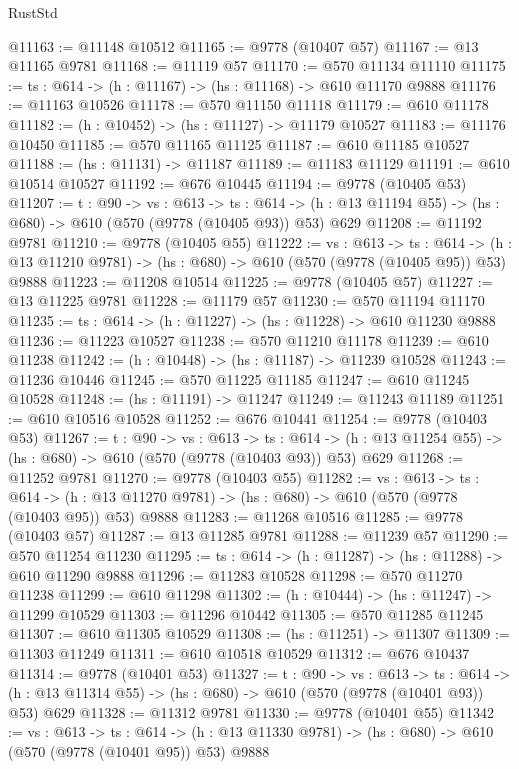 \begin{lexlean}{RustStd}
\begin{coremodule}
@11163 := @11148 @10512
@11165 := @9778 (@10407 @57)
@11167 := @13 @11165 @9781
@11168 := @11119 @57
@11170 := @570 @11134 @11110
@11175 := {ts : @614} -> (h : @11167) -> (hs : @11168) -> @610 @11170 @9888
@11176 := @11163 @10526
@11178 := @570 @11150 @11118
@11179 := @610 @11178
@11182 := (h : @10452) -> (hs : @11127) -> @11179 @10527
@11183 := @11176 @10450
@11185 := @570 @11165 @11125
@11187 := @610 @11185 @10527
@11188 := (hs : @11131) -> @11187
@11189 := @11183 @11129
@11191 := @610 @10514 @10527
@11192 := @676 @10445
@11194 := @9778 (@10405 @53)
@11207 := {t : @90} ->
  {vs : @613} ->
  {ts : @614} -> (h : @13 @11194 @55) -> (hs : @680) -> @610 (@570 (@9778 (@10405 @93)) @53) @629
@11208 := @11192 @9781
@11210 := @9778 (@10405 @55)
@11222 := {vs : @613} ->
  {ts : @614} -> (h : @13 @11210 @9781) -> (hs : @680) -> @610 (@570 (@9778 (@10405 @95)) @53) @9888
@11223 := @11208 @10514
@11225 := @9778 (@10405 @57)
@11227 := @13 @11225 @9781
@11228 := @11179 @57
@11230 := @570 @11194 @11170
@11235 := {ts : @614} -> (h : @11227) -> (hs : @11228) -> @610 @11230 @9888
@11236 := @11223 @10527
@11238 := @570 @11210 @11178
@11239 := @610 @11238
@11242 := (h : @10448) -> (hs : @11187) -> @11239 @10528
@11243 := @11236 @10446
@11245 := @570 @11225 @11185
@11247 := @610 @11245 @10528
@11248 := (hs : @11191) -> @11247
@11249 := @11243 @11189
@11251 := @610 @10516 @10528
@11252 := @676 @10441
@11254 := @9778 (@10403 @53)
@11267 := {t : @90} ->
  {vs : @613} ->
  {ts : @614} -> (h : @13 @11254 @55) -> (hs : @680) -> @610 (@570 (@9778 (@10403 @93)) @53) @629
@11268 := @11252 @9781
@11270 := @9778 (@10403 @55)
@11282 := {vs : @613} ->
  {ts : @614} -> (h : @13 @11270 @9781) -> (hs : @680) -> @610 (@570 (@9778 (@10403 @95)) @53) @9888
@11283 := @11268 @10516
@11285 := @9778 (@10403 @57)
@11287 := @13 @11285 @9781
@11288 := @11239 @57
@11290 := @570 @11254 @11230
@11295 := {ts : @614} -> (h : @11287) -> (hs : @11288) -> @610 @11290 @9888
@11296 := @11283 @10528
@11298 := @570 @11270 @11238
@11299 := @610 @11298
@11302 := (h : @10444) -> (hs : @11247) -> @11299 @10529
@11303 := @11296 @10442
@11305 := @570 @11285 @11245
@11307 := @610 @11305 @10529
@11308 := (hs : @11251) -> @11307
@11309 := @11303 @11249
@11311 := @610 @10518 @10529
@11312 := @676 @10437
@11314 := @9778 (@10401 @53)
@11327 := {t : @90} ->
  {vs : @613} ->
  {ts : @614} -> (h : @13 @11314 @55) -> (hs : @680) -> @610 (@570 (@9778 (@10401 @93)) @53) @629
@11328 := @11312 @9781
@11330 := @9778 (@10401 @55)
@11342 := {vs : @613} ->
  {ts : @614} -> (h : @13 @11330 @9781) -> (hs : @680) -> @610 (@570 (@9778 (@10401 @95)) @53) @9888

\end{coremodule}
\end{lexlean}
